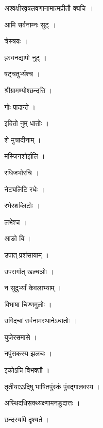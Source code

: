 \documentclass[10pt, openany]{book}
\begin{document}
\noindent अश्वक्षीरवृषलवणानामात्मप्रीतौ क्यचि ।

\noindent आमि सर्वनाम्नः सुट् ।

\noindent त्रेस्त्रयः ।

\noindent ह्रस्वनद्यापो नुट् ।

\noindent षट्चतुर्भ्यश्च ।

\noindent श्रीग्रामण्योश्छन्दसि ।

\noindent गोः पादान्ते ।

\noindent इदितो नुम् धातोः ।

\noindent शे मुचादीनाम् ।

\noindent मस्जिनशोर्झलि ।

\noindent रधिजभोरचि ।

\noindent नेट्यलिटि रधेः ।

\noindent रभेरशब्लिटोः ।

\noindent लभेश्च ।

\noindent आङो यि ।

\noindent उपात् प्रशंसायाम् ।

\noindent उपसर्गात् खल्घञोः ।

\noindent न सुदुर्भ्यां केवलाभ्याम् ।

\noindent विभाषा चिण्णमुलोः ।

\noindent उगिदचां सर्वनामस्थानेऽधातोः ।

\noindent युजेरसमासे ।

\noindent नपुंसकस्य झलचः ।

\noindent इकोऽचि विभक्तौ ।

\noindent तृतीयाऽऽदिषु भाषितपुंस्कं पुंवद्गालवस्य ।

\noindent अस्थिदधिसक्थ्यक्ष्णामनङुदात्तः ।

\noindent छन्दस्यपि दृश्यते ।
\end{document}
